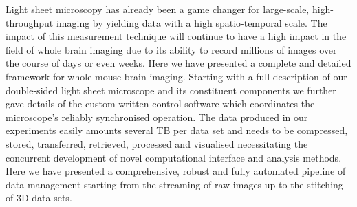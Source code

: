 \documentclass[12pt]{spieman}  %
\begin{document}


Light sheet microscopy has already been a game changer for large-scale, high-throughput imaging by yielding data with a high spatio-temporal scale. The impact of this measurement technique will continue to have a high impact in the field of whole brain imaging due to its ability to record millions of images over the course of days or even weeks. Here we have presented a complete and detailed framework for whole mouse brain imaging. Starting with a full description of our double-sided light sheet microscope and its constituent components we further gave details of the custom-written control software which coordinates the microscope's reliably synchronised operation. The data produced in our experiments easily amounts several TB per data set and needs to be compressed, stored, transferred, retrieved, processed and visualised necessitating the concurrent development of novel computational interface and analysis methods. Here we have presented a comprehensive, robust and fully automated pipeline of data management starting from the streaming of raw images up to the stitching of 3D data sets.
\end{document}
